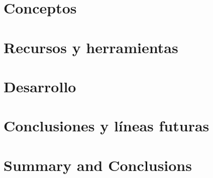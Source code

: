 \documentclass[spanish,a4paper,14pt,oneside]{extreport}
\begin{document}



\chapter{Conceptos}
\label{chapter:conceptos}



\newpage{\pagestyle{empty}}
\thispagestyle{empty}

\chapter{Recursos y herramientas}
\label{chapter:recursos}




\chapter{Desarrollo}
\label{chapter:desarrollo}



\newpage{\pagestyle{empty}}
\thispagestyle{empty}

\chapter{Conclusiones y líneas futuras}
\label{chapter:conclusiones}



\newpage{\pagestyle{empty}}
\thispagestyle{empty}

\chapter{Summary and Conclusions }
\label{chapter:summary}



\newpage{\pagestyle{empty}}
\thispagestyle{empty}
\end{document}
